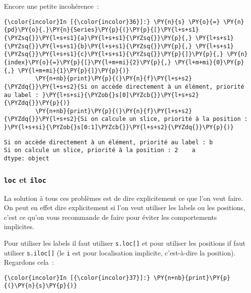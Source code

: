 Encore une petite incohérence~:

    \begin{Verbatim}[commandchars=\\\{\}]
{\color{incolor}In [{\color{incolor}36}]:} \PY{n}{s} \PY{o}{=} \PY{n}{pd}\PY{o}{.}\PY{n}{Series}\PY{p}{(}\PY{p}{[}\PY{l+s+s1}{\PYZsq{}}\PY{l+s+s1}{a}\PY{l+s+s1}{\PYZsq{}}\PY{p}{,} \PY{l+s+s1}{\PYZsq{}}\PY{l+s+s1}{b}\PY{l+s+s1}{\PYZsq{}}\PY{p}{,} \PY{l+s+s1}{\PYZsq{}}\PY{l+s+s1}{c}\PY{l+s+s1}{\PYZsq{}}\PY{p}{]}\PY{p}{,} \PY{n}{index}\PY{o}{=}\PY{p}{[}\PY{l+m+mi}{2}\PY{p}{,} \PY{l+m+mi}{0}\PY{p}{,} \PY{l+m+mi}{1}\PY{p}{]}\PY{p}{)}
         \PY{n+nb}{print}\PY{p}{(}\PY{n}{f}\PY{l+s+s2}{\PYZdq{}}\PY{l+s+s2}{Si on accède directement à un élément, priorité au label : }\PY{l+s+si}{\PYZob{}s[0]\PYZcb{}}\PY{l+s+s2}{\PYZdq{}}\PY{p}{)}
         \PY{n+nb}{print}\PY{p}{(}\PY{n}{f}\PY{l+s+s2}{\PYZdq{}}\PY{l+s+s2}{Si on calcule un slice, priorité à la position : }\PY{l+s+si}{\PYZob{}s[0:1]\PYZcb{}}\PY{l+s+s2}{\PYZdq{}}\PY{p}{)}
\end{Verbatim}


    \begin{Verbatim}[commandchars=\\\{\}]
Si on accède directement à un élément, priorité au label : b
Si on calcule un slice, priorité à la position : 2    a
dtype: object

    \end{Verbatim}

    \hypertarget{loc-et-iloc}{%
\subsubsection{\texorpdfstring{\texttt{loc} et
\texttt{iloc}}{loc et iloc}}\label{loc-et-iloc}}

    La solution à tous ces problèmes est de dire explicitement ce que l'on
veut faire. On peut en effet dire explicitement si l'on veut utiliser
les labels ou les positions, c'est ce qu'on vous recommande de faire
pour éviter les comportements implicites.

Pour utiliser les labels il faut utiliser \texttt{s.loc{[}{]}} et pour
utiliser les positions if faut utiliser \texttt{s.iloc{[}{]}} (le
\texttt{i} est pour localisation implicite, c'est-à-dire la position).
Regardons cela~:

    \begin{Verbatim}[commandchars=\\\{\}]
{\color{incolor}In [{\color{incolor}37}]:} \PY{n+nb}{print}\PY{p}{(}\PY{n}{s}\PY{p}{)}
\end{Verbatim}


